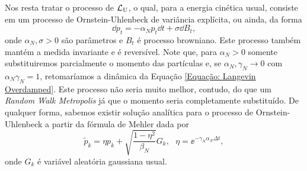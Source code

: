 Nos resta tratar o processo de $\operatorname{\mathcal{L}}_{\operatorname{U}}$, o qual, para a energia cinética usual, consiste em um processo de Ornstein-Uhlenbeck de variância explícita, ou ainda, da forma $$\dd p_t = - \alpha_N p_t \dd t + \sigma \dd B_t,$$ onde $\alpha_N, \sigma > 0$ são parâmetros e $B_t$ é processo browniano. Este processo também mantém a medida invariante e é reversível. Note que, para $\alpha_N > 0$ somente substituiremos parcialmente o momento das partículas e, se $\alpha_N, \gamma_N \rightarrow 0$ com $\alpha_N \gamma_N = 1$, retomaríamos a dinâmica da Equação \eqref{Equação: Langevin Overdamped}. Este processo não seria muito melhor, contudo, do que um \textit{Random Walk Metropolis} já que o momento seria completamente substituído. \cite[Capítulo~5]{handbookmontecarlo} De qualquer forma, sabemos existir solução analítica para o processo de Ornstein-Uhlenbeck a partir da fórmula de Mehler dada por
\begin{equation}
\tilde{p}_k = \eta p_k + \sqrt{\frac{1-\eta^2}{\beta_N}} G_k, \ \ \ \eta = \ee^{-\gamma_N \alpha_N \Delta t},
\label{Equation: Mehler}
\end{equation}
onde $G_k$ é variável aleatória gaussiana usual. \cite{Chafa2018}

